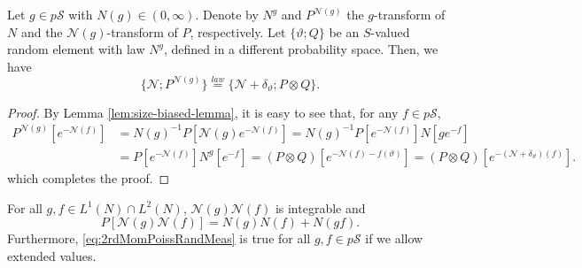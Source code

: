 \begin{thm}\label{prop:sizBaisPoissRandMeas}
	Let $g \in p \mathscr S$ with $N(g)\in (0,\infty).$
	Denote by $N^g$ and $P^{\mathcal N(g)}$ the $g$-transform of $N$ and the $\mathcal N(g)$-transform of $P$, respectively.
	Let $\{\vartheta;Q\}$ be an $S$-valued random element  with law $N^g$, defined in a different probability space.
	Then, we have
\[
	\{\mathcal N;P^{\mathcal N(g)}\}
	\overset{law}{=} \{\mathcal N + \delta_\vartheta;P\otimes Q\}.
\]
\end{thm}
\begin{proof}
	By Lemma \ref{lem:size-biased-lemma}, it is easy to see that, for any $f\in p\mathscr S$,
\[\begin{split}
	P^{\mathcal N(g)}[e^{-\mathcal N(f)}]
	&= N(g)^{-1} P[\mathcal N(g) e^{-\mathcal N(f)}]
	= N(g)^{-1} P[e^{-\mathcal N(f)}] N[ge^{-f}]\\
	&=  P[e^{-\mathcal N(f)}] N^g[e^{-f}]
	= (P\otimes Q)[e^{-\mathcal N(f) - f(\vartheta)}]
	= (P\otimes Q)[e^{-(\mathcal N + \delta_\vartheta)(f)}].
\end{split}\]
	which completes the proof.
\end{proof}
\begin{lem}\label{lem:covPoissRandMeas}
	For all $g, f \in L^1(N) \cap L^2(N)$, $\mathcal N(g) \mathcal N(f)$ is integrable and
\begin{equation}\label{eq:2rdMomPoissRandMeas}
	P [\mathcal N(g) \mathcal N(f)]
	= N(g) N(f) + N(g f).
\end{equation}
	Furthermore, \eqref{eq:2rdMomPoissRandMeas} is true for all $g,f\in p\mathscr S$ if we allow extended values.
\end{lem}
